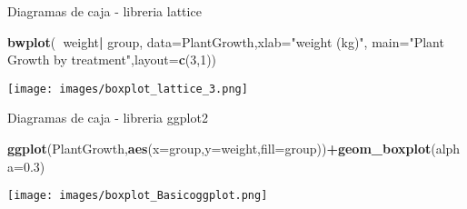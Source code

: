 \documentclass[ignorenonframetext,]{beamer}
\newenvironment{Shaded}{\begin{snugshade}}{\end{snugshade}}
\newcommand{\KeywordTok}[1]{\textcolor[rgb]{0.13,0.29,0.53}{\textbf{#1}}}
\newcommand{\DataTypeTok}[1]{\textcolor[rgb]{0.13,0.29,0.53}{#1}}
\newcommand{\DecValTok}[1]{\textcolor[rgb]{0.00,0.00,0.81}{#1}}
\newcommand{\FloatTok}[1]{\textcolor[rgb]{0.00,0.00,0.81}{#1}}
\newcommand{\StringTok}[1]{\textcolor[rgb]{0.31,0.60,0.02}{#1}}
\newcommand{\OperatorTok}[1]{\textcolor[rgb]{0.81,0.36,0.00}{\textbf{#1}}}
\newcommand{\NormalTok}[1]{#1}
\begin{document}
\begin{frame}[fragile]{Diagramas de caja - libreria lattice}

\begin{Shaded}
\begin{Highlighting}[]
\KeywordTok{bwplot}\NormalTok{(}\OperatorTok{~}\NormalTok{weight}\OperatorTok{|}\StringTok{ }\NormalTok{group, }\DataTypeTok{data=}\NormalTok{PlantGrowth,}\DataTypeTok{xlab=}\StringTok{"weight (kg)"}\NormalTok{,}
\DataTypeTok{main=}\StringTok{"Plant Growth by treatment"}\NormalTok{,}\DataTypeTok{layout=}\KeywordTok{c}\NormalTok{(}\DecValTok{3}\NormalTok{,}\DecValTok{1}\NormalTok{))}
\end{Highlighting}
\end{Shaded}

\texttt{[image: images/boxplot\_lattice\_3.png]}

\end{frame}

\begin{frame}[fragile]{Diagramas de caja - libreria ggplot2}

\begin{Shaded}
\begin{Highlighting}[]
\KeywordTok{ggplot}\NormalTok{(PlantGrowth,}\KeywordTok{aes}\NormalTok{(}\DataTypeTok{x=}\NormalTok{group,}\DataTypeTok{y=}\NormalTok{weight,}\DataTypeTok{fill=}\NormalTok{group))}\OperatorTok{+}\KeywordTok{geom_boxplot}\NormalTok{(}\DataTypeTok{alpha=}\FloatTok{0.3}\NormalTok{)}
\end{Highlighting}
\end{Shaded}

\texttt{[image: images/boxplot\_Basicoggplot.png]}

\end{frame}
\end{document}
